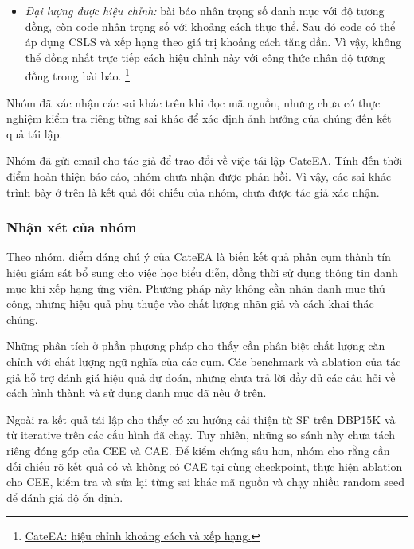 \begin{itemize}
  \item \textit{Đại lượng được hiệu chỉnh:} bài báo nhân trọng
  số danh mục với độ tương đồng, còn code nhân trọng số với
  khoảng cách thực thể. Sau đó code có thể áp dụng CSLS và
  xếp hạng theo giá trị khoảng cách tăng dần. Vì vậy, không
  thể đồng nhất trực tiếp cách hiệu chỉnh này với công thức
  nhân độ tương đồng trong bài báo.
  \footnote{\href{https://github.com/Melkor0007/CateEA/blob/8c277f3292b98f22aaaecb75d01ac44487cefed6/src/myrun.py\#L786-L810}{CateEA: hiệu chỉnh khoảng cách và xếp hạng.}}
\end{itemize}


Nhóm đã xác nhận các sai khác trên khi đọc mã nguồn, nhưng chưa có thực nghiệm kiểm tra riêng từng sai khác để xác định ảnh hưởng của chúng đến kết quả tái lập.

Nhóm đã gửi email cho tác giả để trao đổi về việc tái lập
CateEA. Tính đến thời điểm hoàn thiện báo cáo, nhóm chưa
nhận được phản hồi. Vì vậy, các sai khác trình bày ở trên
là kết quả đối chiếu của nhóm, chưa được tác giả xác nhận.


\subsubsection{Nhận xét của nhóm}

Theo nhóm, điểm đáng chú ý của CateEA là biến kết quả phân cụm thành tín hiệu giám sát bổ sung cho việc học biểu diễn, đồng thời sử dụng thông tin danh mục khi xếp hạng ứng viên. Phương pháp này không cần nhãn danh mục thủ công, nhưng hiệu quả phụ thuộc vào chất lượng nhãn giả và cách khai thác chúng.

Những phân tích ở phần phương pháp cho thấy cần phân biệt chất lượng căn chỉnh với chất lượng ngữ nghĩa của các cụm. Các benchmark và ablation của tác giả hỗ trợ đánh giá hiệu quả dự đoán, nhưng chưa trả lời đầy đủ các câu hỏi về cách hình thành và sử dụng danh mục đã nêu ở trên.

Ngoài ra kết quả tái lập cho thấy có xu hướng cải thiện từ SF trên DBP15K và từ iterative trên các cấu hình đã chạy. Tuy nhiên, những so sánh này chưa tách riêng đóng góp của CEE và CAE. Để kiểm chứng sâu hơn, nhóm cho rằng cần đối chiếu rõ kết quả có và không có CAE tại cùng checkpoint, thực hiện ablation cho CEE, kiểm tra và sửa lại từng sai khác mã nguồn và chạy nhiều random seed để đánh giá độ ổn định.